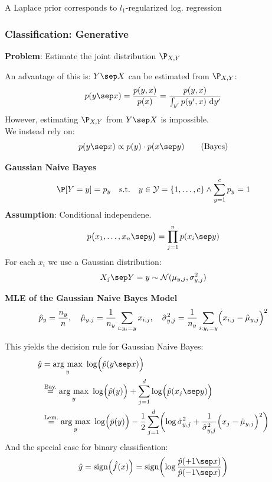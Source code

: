 {\footnotesize
    \remark A Laplace prior corresponds to $l_1$-regularized log. regression
}

\subsubsection{Classification: Generative}

\textbf{Problem}: Estimate the joint distribution $\P_{X,Y}$

An advantage of this is: $Y\sep X$ can be estimated from $\P_{X,Y}$:
$$
    p(y\sep x) = \frac{p(y,x)}{p(x)} = \frac{p(y,x)}{\int_{y'}p(y',x)\ \text{d}y'}
$$
However, estimating $\P_{X,Y}$ from $Y \sep X$ is impossible.\\ 
We instead rely on:
$$
    p(y\sep x) \propto p(y)\cdot p(x\sep y) \qquad \text{(Bayes)}
$$

\method \textbf{Gaussian Naive Bayes}\\
$$
    \P[Y=y] = p_y \quad \text{s.t.} \quad y \in \mathcal{Y} = \{1,\ldots,c\} \land \sum_{y=1}^c p_y = 1
$$
\textbf{Assumption}: Conditional independene.\\
$$
    p\bigl( x_1,\ldots,x_n \sep y \bigr) = \prod_{j=1}^n p(x_i \sep y)
$$
For each $x_i$ we use a Gaussian distribution:
$$
    X_j \sep Y = y \sim \mathcal{N}(\mu_{y,j},\sigma^2_{y,j})
$$

\newpage

\lemma \textbf{MLE of the Gaussian Naive Bayes Model}
{\small
$$
    \hat{p}_y = \frac{n_y}{n},\quad \hat{\mu}_{y,j} = \frac{1}{n_y}\sum_{i:y_i=y} x_{i,j},\quad \hat{\sigma}^2_{y,j} = \frac{1}{n_y} \sum_{i:y_i=y}\Bigl( x_{i,j}-\hat{\mu}_{y,j} \Bigr)^2
$$
}

This yields the decision rule for Gaussian Naive Bayes:
{\small
\begin{align*}
    \hat{y} &= \underset{y}{\text{arg max}}\ \log\Bigl( \hat{p}(y\sep x) \Bigr) \\
            &\overset{\text{Bay.}}{=} \underset{y}{\text{arg max}}\ \log\Bigl( \hat{p}(y) \Bigr) + \sum_{j=1}^d \log\Bigl( \hat{p}(x_j\sep y) \Bigr) \\
            &\overset{\text{Lem.}}{=} \underset{y}{\text{arg max}}\ \log\Bigl( \hat{p}(y) \Bigr) - \frac{1}{2}\sum_{j=1}^d\biggl( \log \hat{\sigma}^2_{y,j} + \frac{1}{\hat{\sigma}^2_{y,j}}\Bigl( x_j - \hat{\mu}_{y,j} \Bigr)^2 \biggr)
\end{align*}
}
And the special case for binary classification:
{\small
$$
    \hat{y} = \text{sign}\Bigl( \hat{f}(x) \Bigr) = \text{sign}\biggl( \log\frac{\hat{p}(+1\sep x)}{\hat{p}(-1\sep x)} \biggr)
$$
}

